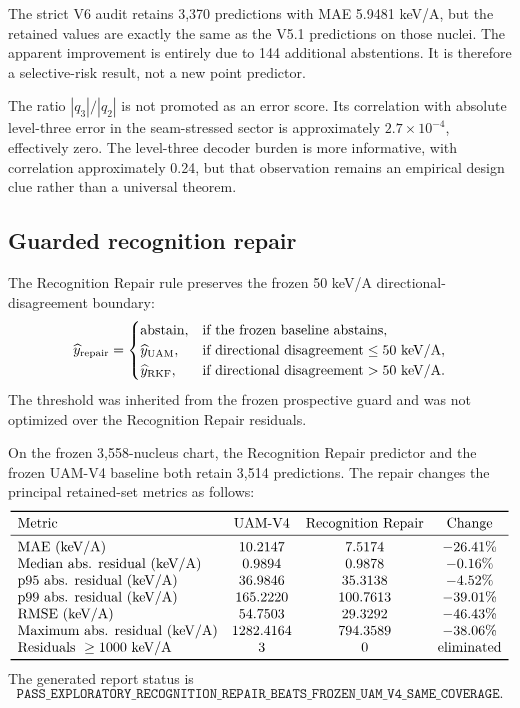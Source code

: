 The strict V6 audit retains 3,370 predictions with MAE 5.9481 keV/A, but the retained values are exactly the same as the V5.1 predictions on those nuclei. The apparent improvement is entirely due to 144 additional abstentions. It is therefore a selective-risk result, not a new point predictor.

The ratio $|q_3|/|q_2|$ is not promoted as an error score. Its correlation with absolute level-three error in the seam-stressed sector is approximately $2.7\times10^{-4}$, effectively zero. The level-three decoder burden is more informative, with correlation approximately 0.24, but that observation remains an empirical design clue rather than a universal theorem.

\subsection{Guarded recognition repair}

The Recognition Repair rule preserves the frozen 50 keV/A directional-disagreement boundary:
\[
\widehat y_{\mathrm{repair}}=
\begin{cases}
\text{abstain},&\text{if the frozen baseline abstains},\\
\widehat y_{\mathrm{UAM}},&\text{if directional disagreement}\le50\ \mathrm{keV/A},\\
\widehat y_{\mathrm{RKF}},&\text{if directional disagreement}>50\ \mathrm{keV/A}.
\end{cases}
\]
The threshold was inherited from the frozen prospective guard and was not optimized over the Recognition Repair residuals.

\begin{proposition}\label{thm:t45performance}
On the frozen 3,558-nucleus chart, the Recognition Repair predictor and the frozen UAM-V4 baseline both retain 3,514 predictions. The repair changes the principal retained-set metrics as follows:
\[
\begin{array}{lccc}
\toprule
\text{Metric} & \text{UAM-V4} & \text{Recognition Repair} & \text{Change}\\
\midrule
\text{MAE (keV/A)} & 10.2147 & 7.5174 & -26.41\%\\
\text{Median abs. residual (keV/A)} & 0.9894 & 0.9878 & -0.16\%\\
\text{p95 abs. residual (keV/A)} & 36.9846 & 35.3138 & -4.52\%\\
\text{p99 abs. residual (keV/A)} & 165.2220 & 100.7613 & -39.01\%\\
\text{RMSE (keV/A)} & 54.7503 & 29.3292 & -46.43\%\\
\text{Maximum abs. residual (keV/A)} & 1282.4164 & 794.3589 & -38.06\%\\
\text{Residuals }\ge1000\ \text{keV/A} & 3 & 0 & \text{eliminated}\\
\bottomrule
\end{array}
\]
The generated report status is
\[
 \texttt{PASS\_EXPLORATORY\_RECOGNITION\_REPAIR\_BEATS\_FROZEN\_UAM\_V4\_SAME\_COVERAGE}.
\]
\end{proposition}


